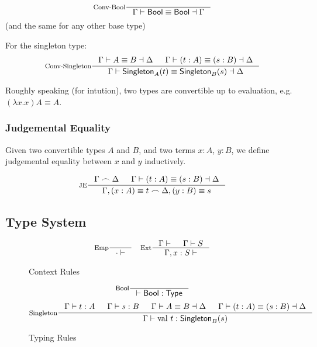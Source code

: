 \[
\inference[Conv-Bool]{}{\Gamma \vdash \Bool \equiv \Bool \dashv \Gamma}
\]
(and the same for any other base type)

For the singleton type:
\[
\inference[Conv-Singleton]
    { \Gamma \vdash A \equiv B \dashv \Delta
    & \Gamma \vdash (t : A) \equiv (s : B) \dashv \Delta
    }
    { \Gamma \vdash \Singleton{A}{t} \equiv \Singleton{B}{s} \dashv \Delta }
\]

Roughly speaking (for intution), two types are convertible up to evaluation, e.g. $(\lambda x. x) A \equiv A$.

\subsubsection{Judgemental Equality}
Given two convertible types $A$ and $B$, and two terms $x : A$, $y : B$, we define judgemental equality between $x$ and $y$ inductively.

\[
  \inference[JE]
  { \twin{\Gamma}{\Delta}
  & \Gamma \vdash (t : A) \equiv (s : B) \dashv \Delta
  }
  {\twin{\Gamma, (x : A) \equiv t}{\Delta, (y : B) \equiv s}}
\]

\subsection{Type System}
\begin{figure*}[h]
  \[
    \inference[Emp]{}
                    {\cdot \vdash}
    \quad
    \inference[Ext]{\Gamma \vdash & \Gamma \vdash S}
                     {\Gamma, x : S \vdash}
  \]

  \caption*{Context Rules}
  \label{fig:base-dt-context}
\end{figure*}

\begin{figure*}[h]
  \[
    \inference[\Bool]{}
                    {\vdash \Bool : \Type}
  \]
  \[
    \inference[Singleton]{\Gamma \vdash t : A & \Gamma \vdash s : B & \Gamma \vdash A \equiv B \dashv \Delta & \Gamma \vdash (t : A) \equiv (s : B) \dashv \Delta}
                     {\Gamma \vdash \val{t} : \Singleton{B}{s}}
  \]

  \caption*{Typing Rules}
  \label{fig:base-dt-typing}
\end{figure*}
